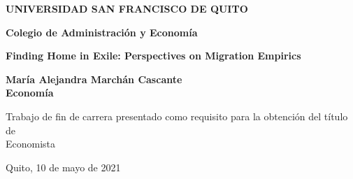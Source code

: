 \documentclass[../main.tex]{subfiles}
\begin{document}
\begin{titlepage}
\centering
{\Large \textbf{UNIVERSIDAD SAN FRANCISCO DE QUITO}}

\vspace{1cm} 
{\large \textbf{Colegio de Administración y Economía}}

\vspace{2.5cm}
{\Large \textbf{Finding Home in Exile: Perspectives on Migration Empirics}}

\vspace{2cm}
{\Large \textbf{María Alejandra Marchán Cascante} \\ \textbf{Economía}}

\vspace{1.5cm}
{\large Trabajo de fin de carrera presentado como requisito para la obtención del título de \\ Economista}

\vspace{2.5cm}
Quito, 10 de mayo de 2021
\end{titlepage}
\end{document}
